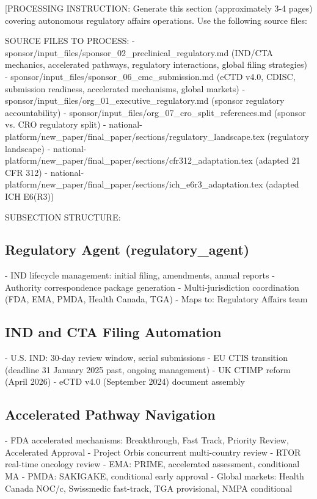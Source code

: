 
[PROCESSING INSTRUCTION: Generate this section (approximately 3-4 pages) covering autonomous
regulatory affairs operations. Use the following source files:

SOURCE FILES TO PROCESS:
- sponsor/input\_files/sponsor\_02\_preclinical\_regulatory.md (IND/CTA mechanics, accelerated
  pathways, regulatory interactions, global filing strategies)
- sponsor/input\_files/sponsor\_06\_cmc\_submission.md (eCTD v4.0, CDISC, submission readiness,
  accelerated mechanisms, global markets)
- sponsor/input\_files/org\_01\_executive\_regulatory.md (sponsor regulatory accountability)
- sponsor/input\_files/org\_07\_cro\_split\_references.md (sponsor vs. CRO regulatory split)
- national-platform/new\_paper/final\_paper/sections/regulatory\_landscape.tex (regulatory landscape)
- national-platform/new\_paper/final\_paper/sections/cfr312\_adaptation.tex (adapted 21 CFR 312)
- national-platform/new\_paper/final\_paper/sections/ich\_e6r3\_adaptation.tex (adapted ICH E6(R3))

SUBSECTION STRUCTURE:

\subsection{Regulatory Agent (regulatory\_agent)}
- IND lifecycle management: initial filing, amendments, annual reports
- Authority correspondence package generation
- Multi-jurisdiction coordination (FDA, EMA, PMDA, Health Canada, TGA)
- Maps to: Regulatory Affairs team

\subsection{IND and CTA Filing Automation}
- U.S. IND: 30-day review window, serial submissions
- EU CTIS transition (deadline 31 January 2025 past, ongoing management)
- UK CTIMP reform (April 2026)
- eCTD v4.0 (September 2024) document assembly

\subsection{Accelerated Pathway Navigation}
- FDA accelerated mechanisms: Breakthrough, Fast Track, Priority Review, Accelerated Approval
- Project Orbis concurrent multi-country review
- RTOR real-time oncology review
- EMA: PRIME, accelerated assessment, conditional MA
- PMDA: SAKIGAKE, conditional early approval
- Global markets: Health Canada NOC/c, Swissmedic fast-track, TGA provisional, NMPA conditional

